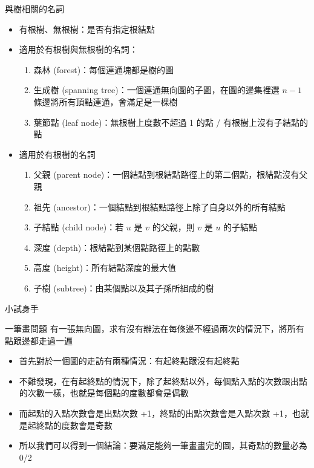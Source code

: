 \documentclass[aspectratio=169]{beamer}
\begin{document}
    \begin{frame}{與樹相關的名詞}
        \begin{itemize}
            \item 有根樹、無根樹：是否有指定根結點
            \item 適用於有根樹與無根樹的名詞：
            \begin{enumerate}
                \item 森林 (forest)：每個連通塊都是樹的圖
                \item 生成樹 (spanning tree)：一個連通無向圖的子圖，在圖的邊集裡選 $n-1$ 條邊將所有頂點連通，會滿足是一棵樹
                \item 葉節點 (leaf node)：無根樹上度數不超過 1 的點 / 有根樹上沒有子結點的點
            \end{enumerate}
            \item 適用於有根樹的名詞
            \begin{enumerate}
                \item 父親 (parent node)：一個結點到根結點路徑上的第二個點，根結點沒有父親
                \item 祖先 (ancestor)：一個結點到根結點路徑上除了自身以外的所有結點
                \item 子結點 (child node)：若 $u$ 是 $v$ 的父親，則 $v$ 是 $u$ 的子結點
                \item 深度 (depth)：根結點到某個點路徑上的點數
                \item 高度 (height)：所有結點深度的最大值
                \item 子樹 (subtree)：由某個點以及其子孫所組成的樹
            \end{enumerate}
        \end{itemize}
    \end{frame}

    \begin{frame}{小試身手}
        \begin{block}{一筆畫問題}
            有一張無向圖，求有沒有辦法在每條邊不經過兩次的情況下，將所有點跟邊都走過一遍
        \end{block}

        \begin{itemize}
            \item 首先對於一個圖的走訪有兩種情況：有起終點跟沒有起終點
            \item 不難發現，在有起終點的情況下，除了起終點以外，每個點入點的次數跟出點的次數一樣，也就是每個點的度數都會是偶數
            \item 而起點的入點次數會是出點次數 +1，終點的出點次數會是入點次數 +1，也就是起終點的度數會是奇數
            \item 所以我們可以得到一個結論：要滿足能夠一筆畫畫完的圖，其奇點的數量必為 0/2
        \end{itemize}
    \end{frame}
\end{document}
